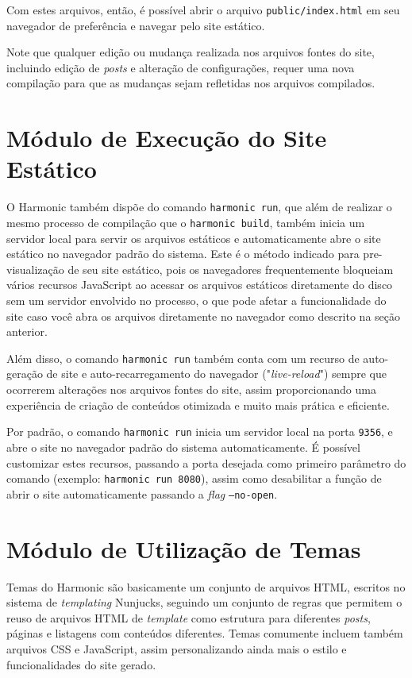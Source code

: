 \documentclass[ppginf, pep]{esinucpel}
\newcommand{\code}[1]{\texttt{#1}}
\begin{document}
Com estes arquivos, então, é possível abrir o arquivo \code{public/index.html} em seu navegador de preferência e navegar pelo site estático.

Note que qualquer edição ou mudança realizada nos arquivos fontes do site, incluindo edição de \textit{posts} e alteração de configurações, requer uma nova compilação para que as mudanças sejam refletidas nos arquivos compilados.

\section{Módulo de Execução do Site Estático}

O Harmonic também dispõe do comando \code{harmonic run}, que além de realizar o mesmo processo de compilação que o \code{harmonic build}, também inicia um servidor local para servir os arquivos estáticos e automaticamente abre o site estático no navegador padrão do sistema. Este é o método indicado para pre-visualização de seu site estático, pois os navegadores frequentemente bloqueiam vários recursos JavaScript ao acessar os arquivos estáticos diretamente do disco sem um servidor envolvido no processo, o que pode afetar a funcionalidade do site caso você abra os arquivos diretamente no navegador como descrito na seção anterior.

Além disso, o comando \code{harmonic run} também conta com um recurso de auto-geração de site e auto-recarregamento do navegador ("\textit{live-reload}") sempre que ocorrerem alterações nos arquivos fontes do site, assim proporcionando uma experiência de criação de conteúdos otimizada e muito mais prática e eficiente.

Por padrão, o comando \code{harmonic run} inicia um servidor local na porta \code{9356}, e abre o site no navegador padrão do sistema automaticamente. É possível customizar estes recursos, passando a porta desejada como primeiro parâmetro do comando (exemplo: \code{harmonic run 8080}), assim como desabilitar a função de abrir o site automaticamente passando a \textit{flag} \code{--no-open}.

\section{Módulo de Utilização de Temas}

Temas do Harmonic são basicamente um conjunto de arquivos HTML, escritos no sistema de \textit{templating} Nunjucks, seguindo um conjunto de regras que permitem o reuso de arquivos HTML de \textit{template} como estrutura para diferentes \textit{posts}, páginas e listagens com conteúdos diferentes. Temas comumente incluem também arquivos CSS e JavaScript, assim personalizando ainda mais o estilo e funcionalidades do site gerado.
\end{document}
